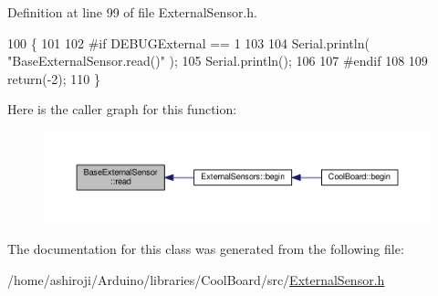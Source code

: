 Definition at line 99 of file External\+Sensor.\+h.


\begin{DoxyCode}
100     \{
101     
102 \textcolor{preprocessor}{    #if DEBUGExternal == 1 }
103 
104         Serial.println( \textcolor{stringliteral}{"BaseExternalSensor.read()"} );
105         Serial.println();
106     
107 \textcolor{preprocessor}{    #endif      }
108         
109         \textcolor{keywordflow}{return}(-2);
110     \}
\end{DoxyCode}
Here is the caller graph for this function\+:\nopagebreak
\begin{figure}[H]
\begin{center}
\leavevmode
\includegraphics[width=350pt]{d1/d68/class_base_external_sensor_a1564f16deacf57b51b9948ac29db4291_icgraph}
\end{center}
\end{figure}


The documentation for this class was generated from the following file\+:\begin{DoxyCompactItemize}
\item 
/home/ashiroji/\+Arduino/libraries/\+Cool\+Board/src/\hyperlink{_external_sensor_8h}{External\+Sensor.\+h}\end{DoxyCompactItemize}
